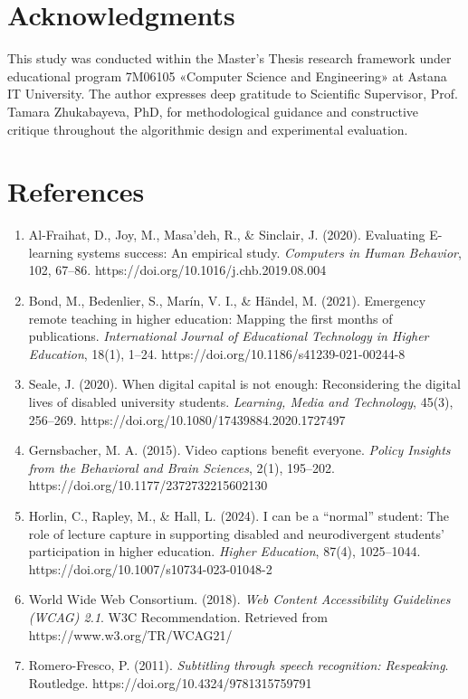 \documentclass[12pt,a4paper]{article}
\begin{document}
\section*{Acknowledgments}
This study was conducted within the Master's Thesis research framework under educational program 7M06105 «Computer Science and Engineering» at Astana IT University. The author expresses deep gratitude to Scientific Supervisor, Prof. Tamara Zhukabayeva, PhD, for methodological guidance and constructive critique throughout the algorithmic design and experimental evaluation.

\section*{References}
\begin{enumerate}
    \item Al-Fraihat, D., Joy, M., Masa'deh, R., \& Sinclair, J. (2020). Evaluating E-learning systems success: An empirical study. \textit{Computers in Human Behavior}, 102, 67--86. https://doi.org/10.1016/j.chb.2019.08.004
    \item Bond, M., Bedenlier, S., Mar\'in, V. I., \& H\"andel, M. (2021). Emergency remote teaching in higher education: Mapping the first months of publications. \textit{International Journal of Educational Technology in Higher Education}, 18(1), 1--24. https://doi.org/10.1186/s41239-021-00244-8
    \item Seale, J. (2020). When digital capital is not enough: Reconsidering the digital lives of disabled university students. \textit{Learning, Media and Technology}, 45(3), 256--269. https://doi.org/10.1080/17439884.2020.1727497
    \item Gernsbacher, M. A. (2015). Video captions benefit everyone. \textit{Policy Insights from the Behavioral and Brain Sciences}, 2(1), 195--202. https://doi.org/10.1177/2372732215602130
    \item Horlin, C., Rapley, M., \& Hall, L. (2024). I can be a ``normal'' student: The role of lecture capture in supporting disabled and neurodivergent students' participation in higher education. \textit{Higher Education}, 87(4), 1025--1044. https://doi.org/10.1007/s10734-023-01048-2
    \item World Wide Web Consortium. (2018). \textit{Web Content Accessibility Guidelines (WCAG) 2.1}. W3C Recommendation. Retrieved from https://www.w3.org/TR/WCAG21/
    \item Romero-Fresco, P. (2011). \textit{Subtitling through speech recognition: Respeaking}. Routledge. https://doi.org/10.4324/9781315759791

\end{enumerate}
\end{document}
